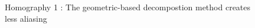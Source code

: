 \begin{figure}
\caption{Homography 1 : The geometric-based decompostion method creates less aliasing}
\label{Homo1}
\end{figure}

